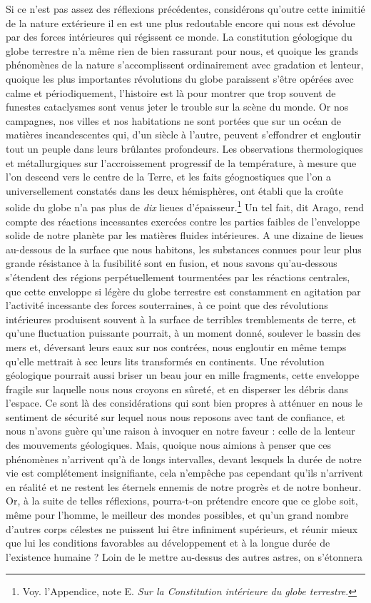 \documentclass[a4paper, 11pt, oneside]{article}
\begin{document}
Si ce n'est pas assez des réflexions précédentes, considérons qu'outre cette inimitié de la nature extérieure il en est une plus redoutable encore qui nous est dévolue par des forces intérieures qui régissent ce monde. La constitution géologique du globe terrestre n'a même rien de bien rassurant pour nous, et quoique les grands phénomènes de la nature s'accomplissent ordinairement avec gradation et lenteur, quoique les plus importantes révolutions du globe paraissent s'être opérées avec calme et périodiquement, l'histoire est là pour montrer que trop souvent de funestes cataclysmes sont venus jeter le trouble sur la scène du monde. Or nos campagnes, nos villes et nos habitations ne sont portées que sur un océan de matières incandescentes qui, d'un siècle à l'autre, peuvent s'effondrer et engloutir tout un peuple dans leurs brûlantes profondeurs. Les observations thermologiques et métallurgiques sur l'accroissement progressif de la température, à mesure que l'on descend vers le centre de la Terre, et les faits géognostiques que l'on a universellement constatés dans les deux hémisphères, ont établi que la croûte solide du globe n'a pas plus de \emph{dix} lieues d'épaisseur.\footnote{Voy. l'Appendice, note E. \emph{Sur la Constitution intérieure du globe terrestre}.} Un tel fait, dit Arago, rend compte des réactions incessantes exercées contre les parties faibles de l'enveloppe solide de notre planète par les matières fluides intérieures. A une dizaine de lieues au-dessous de la surface que nous habitons, les substances connues pour leur plus grande résistance à la fusibilité sont en fusion, et nous savons qu'au-dessous s'étendent des régions perpétuellement tourmentées par les réactions centrales, que cette enveloppe si légère du globe terrestre est constamment en agitation par l'activité incessante des forces souterraines, à ce point que des révolutions intérieures produisent souvent à la surface de terribles tremblements de terre, et qu'une fluctuation puissante pourrait, à un moment donné, soulever le bassin des mers et, déversant leurs eaux sur nos contrées, nous engloutir en même temps qu'elle mettrait à sec leurs lits transformés en continents. Une révolution géologique pourrait aussi briser un beau jour en mille fragments, cette enveloppe fragile sur laquelle nous nous croyons en sûreté, et en disperser les débris dans l'espace. Ce sont là des considérations qui sont bien propres à atténuer en nous le sentiment de sécurité sur lequel nous nous reposons avec tant de confiance, et nous n'avons guère qu'une raison à invoquer en notre faveur : celle de la lenteur des mouvements géologiques. Mais, quoique nous aimions à penser que ces phénomènes n'arrivent qu'à de longs intervalles, devant lesquels la durée de notre vie est complétement insignifiante, cela n'empêche pas cependant qu'ils n'arrivent en réalité et ne restent les éternels ennemis de notre progrès et de notre bonheur. Or, à la suite de telles réflexions, pourra-t-on prétendre encore que ce globe soit, même pour l'homme, le meilleur des mondes possibles, et qu'un grand nombre d'autres corps célestes ne puissent lui être infiniment supérieurs, et réunir mieux que lui les conditions favorables au développement et à la longue durée de l'existence humaine ? Loin de le mettre au-dessus des autres astres, on s'étonnera 
\end{document}
